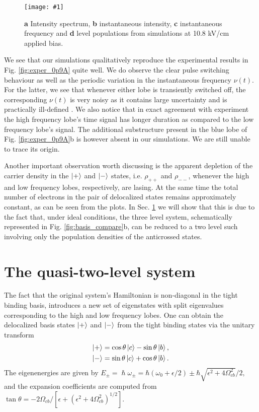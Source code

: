 \documentclass[]{spie}  %
\newcommand{\includegraphicsXL}[1]{\texttt{[image: \#1]}}
\begin{document}
\begin{figure}[h!]
	\begin{center}
		\includegraphicsXL{IMGS/sim_10p8.eps}
		\caption{ \textbf{a} Intensity spectrum, \textbf{b} instantaneous intensity, \textbf{c} instantaneous frequency and \textbf{d} level populations from simulations at 10.8 kV/cm applied bias.} \label{fig:sim_10p8}
	\end{center}	
\end{figure}

We see that our simulations qualitatively reproduce the experimental results in Fig. \ref{fig:exper_0p9A} quite well. We do observe the clear pulse switching behaviour as well as the periodic variation in the instantaneous frequency $\nu(t)$. For the latter, we see that whenever either lobe is transiently switched off, the corresponding $\nu(t)$ is very noisy as it contains large uncertainty and is practically ill-defined \cite{burghoff2014broadband}. We also notice that in exact agreement with experiment the high frequency lobe's time signal has longer duration as compared to the low frequency lobe's signal. The additional substructure present in the blue lobe of Fig. \ref{fig:exper_0p9A}b is however absent in our simulations. We are still unable to trace its origin. 

Another important observation worth discussing is the apparent depletion of the carrier density in the $\ket{+}$ and $\ket{-}$ states, i.e. $\rho_{++}$ and $\rho_{--}$, whenever the high and low frequency lobes, respectively, are lasing. At the same time the total number of electrons in the pair of delocalized states remains approximately constant, as can be seen from the plots. In Sec. \ref{sec:theoretical-explaination-pulse-switching} we will show that this is due to the fact that, under ideal conditions, the three level system, schematically represented in Fig. \ref{fig:basis_compare}b, can be reduced to a two level such involving only the population densities of the anticrossed states. 

\section{The quasi-two-level system}
\label{sec:theoretical-explaination-pulse-switching}
The fact that the original system's Hamiltonian is non-diagonal in the tight binding basis, introduces a new set of eigenstates with split eigenvalues corresponding to the high and low frequency lobes. One can obtain the delocalized basis states $\ket{+}$ and $\ket{-}$ from the tight binding states via the unitary transform
\begin{align}
\label{eq:dressedstates}
\Ket{+} &= \cos\theta \Ket{c} - \sin\theta \Ket{b}, \nonumber \\
\Ket{-} &= \sin\theta \Ket{c} + \cos\theta \Ket{b}.
\end{align}
The eigenenergies are given by
$
E_\pm =\hslash \omega_{\pm} =\hbar(\omega_0 +\epsilon/2) \pm \hbar \sqrt{\epsilon^2+4\Omega_{cb}^2 }/2,
$
and the expansion coefficients are computed from  
$
\tan \theta = -2\Omega_{cb}/[\epsilon+(\epsilon^2+4\Omega_{cb}^2)^{1/2}].
$
\end{document}
